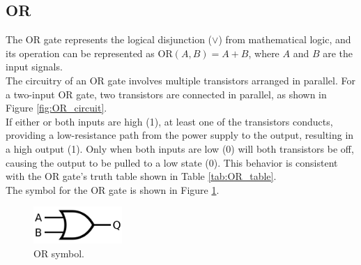 \subsection{OR}
    The OR gate represents the logical disjunction ($\lor$) from mathematical logic, and its operation can be represented as $\text{OR}(A, B) = A + B$, where $A$ and $B$ are the input signals. \\
    The circuitry of an OR gate involves multiple transistors arranged in parallel. 
    For a two-input OR gate, two transistors are connected in parallel, as shown in Figure \ref{fig:OR_circuit}. \\
    If either or both inputs are high (1), at least one of the transistors conducts, providing a low-resistance path from the power supply to the output, resulting in a high output (1). 
    Only when both inputs are low (0) will both transistors be off, causing the output to be pulled to a low state (0).
    This behavior is consistent with the OR gate's truth table shown in Table \ref{tab:OR_table}. \\
    The symbol for the OR gate is shown in Figure \ref{fig:OR_sym}.

    \begin{figure}[H]
	    \centering
	    \includegraphics[width=0.3\textwidth]{figures/symbols/OR.png}
	    \caption{OR symbol.}
	    \label{fig:OR_sym} 
	\end{figure}

